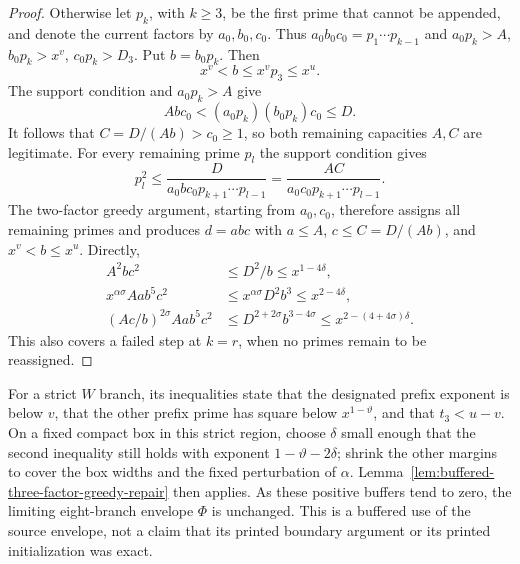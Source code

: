 \begin{proof}
Otherwise let $p_k$, with $k\ge3$, be the first prime that cannot
be appended, and denote the current factors by $a_0,b_0,c_0$.
Thus $a_0b_0c_0=p_1\cdots p_{k-1}$ and
$a_0p_k>A$, $b_0p_k>x^v$, $c_0p_k>D_3$.
Put $b=b_0p_k$.  Then
\[
 x^v<b\le x^v p_3\le x^u.
\]
The support condition and $a_0p_k>A$ give
\[
 A b c_0<(a_0p_k)(b_0p_k)c_0\le D.
\]
It follows that $C=D/(Ab)>c_0\ge1$, so both remaining
capacities $A,C$ are legitimate.  For every remaining prime
$p_l$ the support condition gives
\[
 p_l^2\le
 \frac{D}{a_0bc_0p_{k+1}\cdots p_{l-1}}
 =\frac{AC}{a_0c_0p_{k+1}\cdots p_{l-1}}.
\]
The two-factor greedy argument, starting from $a_0,c_0$, therefore
assigns all remaining primes and produces $d=abc$ with
$a\le A$, $c\le C=D/(Ab)$, and $x^v<b\le x^u$.
Directly,
\begin{align*}
 A^2bc^2&\le D^2/b\le x^{1-4\delta},\\
 x^{\alpha\sigma}Aab^5c^2
 &\le x^{\alpha\sigma}D^2b^3\le x^{2-4\delta},\\
 (Ac/b)^{2\sigma}Aab^5c^2
 &\le D^{2+2\sigma}b^{3-4\sigma}
   \le x^{2-(4+4\sigma)\delta}.
\end{align*}
This also covers a failed step at $k=r$, when no primes remain
to be reassigned.
\end{proof}

For a strict $W$ branch, its inequalities state that the
designated prefix exponent is below $v$, that the other prefix
prime has square below $x^{1-\vartheta}$, and that
$t_3<u-v$.  On a fixed compact box in this strict region, choose
$\delta$ small enough that the second inequality still holds
with exponent $1-\vartheta-2\delta$; shrink the other margins to
cover the box widths and the fixed perturbation of $\alpha$.
Lemma~\ref{lem:buffered-three-factor-greedy-repair} then applies.
As these positive buffers tend to zero, the limiting eight-branch
envelope $\Phi$ is unchanged.  This is a buffered use of the
source envelope, not a claim that its printed boundary argument
or its printed initialization was exact.
